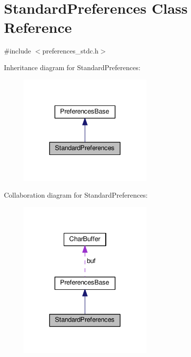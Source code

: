 \hypertarget{classStandardPreferences}{}\section{Standard\+Preferences Class Reference}
\label{classStandardPreferences}


{\ttfamily \#include $<$preferences\+\_\+stdc.\+h$>$}



Inheritance diagram for Standard\+Preferences\+:\nopagebreak
\begin{figure}[H]
\begin{center}
\leavevmode
\includegraphics[width=188pt]{classStandardPreferences__inherit__graph}
\end{center}
\end{figure}


Collaboration diagram for Standard\+Preferences\+:\nopagebreak
\begin{figure}[H]
\begin{center}
\leavevmode
\includegraphics[width=188pt]{classStandardPreferences__coll__graph}
\end{center}
\end{figure}
